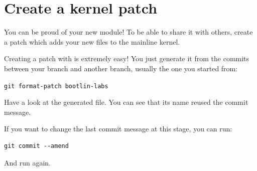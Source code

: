 \section{Create a kernel patch}

You can be proud of your new module! To be able to share it with
others, create a patch which adds your new files to the mainline
kernel.

Creating a patch with  is extremely easy! You just generate it
from the commits between your branch and another branch, usually the
one you started from:

\texttt{git format-patch bootlin-labs}

Have a look at the generated file. You can see that its name reused
the commit message.

If you want to change the last commit message at this stage, you
can run:

\begin{verbatim}
git commit --amend
\end{verbatim}

And run  again.
